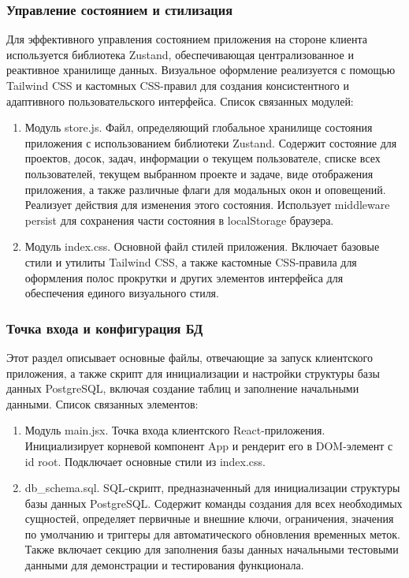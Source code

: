 \subsubsection{Управление состоянием и стилизация}
Для эффективного управления состоянием приложения на стороне клиента используется библиотека Zustand, обеспечивающая централизованное и реактивное хранилище данных. Визуальное оформление реализуется с помощью Tailwind CSS и кастомных CSS-правил для создания консистентного и адаптивного пользовательского интерфейса. Список связанных модулей:
\begin{enumerate}
	\item Модуль store.js. Файл, определяющий глобальное хранилище состояния приложения с использованием библиотеки Zustand. Содержит состояние для проектов, досок, задач, информации о текущем пользователе, списке всех пользователей, текущем выбранном проекте и задаче, виде отображения приложения, а также различные флаги для модальных окон и оповещений. Реализует действия для изменения этого состояния. Использует middleware persist для сохранения части состояния в localStorage браузера.
	\item Модуль index.css. Основной файл стилей приложения. Включает базовые стили и утилиты Tailwind CSS, а также кастомные CSS-правила для оформления полос прокрутки и других элементов интерфейса для обеспечения единого визуального стиля.
\end{enumerate}

\subsubsection{Точка входа и конфигурация БД}
Этот раздел описывает основные файлы, отвечающие за запуск клиентского приложения, а также скрипт для инициализации и настройки структуры базы данных PostgreSQL, включая создание таблиц и заполнение начальными данными. Список связанных элементов:
\begin{enumerate}
	\item Модуль main.jsx. Точка входа клиентского React-приложения. Инициализирует корневой компонент App и рендерит его в DOM-элемент с id root. Подключает основные стили из index.css.
	\item db\_schema.sql. SQL-скрипт, предназначенный для инициализации структуры базы данных PostgreSQL. Содержит команды создания для всех необходимых сущностей, определяет первичные и внешние ключи, ограничения, значения по умолчанию и триггеры для автоматического обновления временных меток. Также включает секцию для заполнения базы данных начальными тестовыми данными для демонстрации и тестирования функционала.
\end{enumerate}

